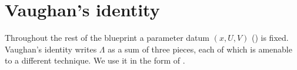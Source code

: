 \chapter{Vaughan's identity}\label{ch:vaughan}

Throughout the rest of the blueprint a parameter datum $(x, U, V)$ () is fixed.
Vaughan's identity writes $\Lambda$ as a sum of three pieces, each of which is
amenable to a different technique. We use it in the form of \cite[\S 26.1]{Koukoulopoulos2019}.




